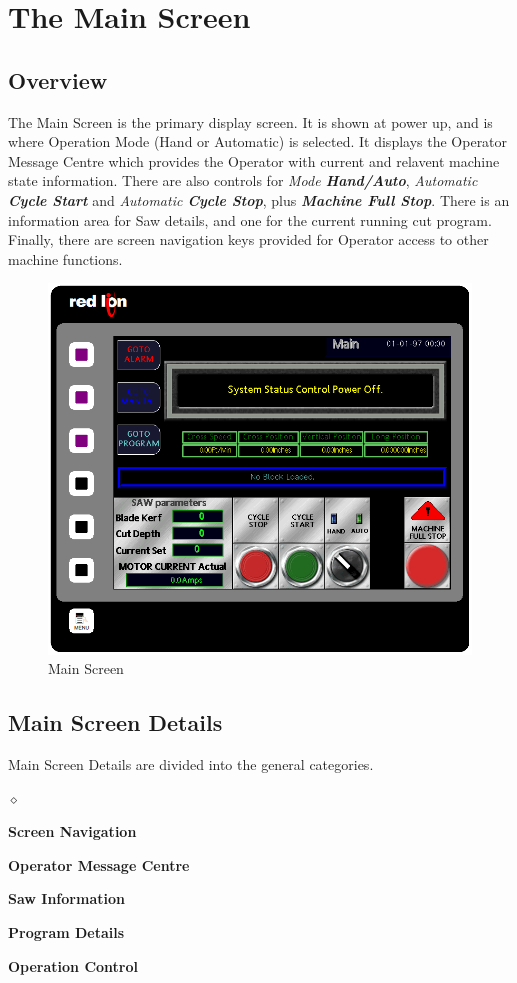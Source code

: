\chapter{The Main Screen}
\section{Overview}
The Main Screen is the primary display screen. It is shown at power up, and is where Operation Mode (Hand or Automatic) is selected. It displays the Operator Message Centre which provides the Operator with current and relavent machine state information. There are also controls for \textit{Mode \textbf{Hand/Auto}}, \textit{Automatic \textbf{Cycle Start}} and \textit{Automatic \textbf{Cycle Stop}}, plus \textbf{\textit{Machine Full Stop}}. There is an information area for Saw details, and one for the current running cut program. Finally, there are screen navigation keys provided for Operator access to other machine functions.
\begin{figure}
	\centering
	\includegraphics[width=0.5\linewidth]{screen-captures/main/main-full}
	\caption{Main Screen}
	\label{fig:main-screen}
\end{figure}
\pagebreak
\section{Main Screen Details}
Main Screen Details are divided into the general categories.
\begin{list}{$\diamond$}{}
	\item \textbf{Screen Navigation}
	\item \textbf{Operator Message Centre}
	\item \textbf{Saw Information}
	\item \textbf{Program Details}
	\item \textbf{Operation Control}
\end{list}
